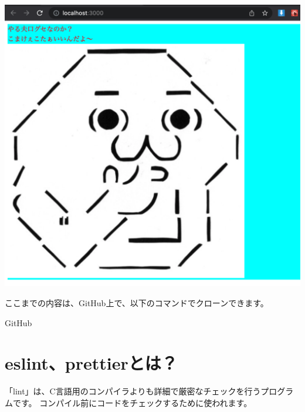 \begin{reviewimage}[H]%
\includegraphics[width=0.6\maxwidth]{./images/02-create-react-app/typescript03.png}%
\label{image:02-create-react-app:typescript03}
\end{reviewimage}
\begin{starternote}[]{}

ここまでの内容は、GitHub上で、以下のコマンドでクローンできます。

\def\startercodeblockfontsize{}
\begin{starterterminal}[]{GitHub}\end{starterterminal}
\end{starternote}

\section{eslint、prettierとは？}
\keeplastskip{
  \label{sec:2-3}
  \label{sec-03lint}
  \par\nobreak
}

「lint」は、C言語用のコンパイラよりも詳細で厳密なチェックを行うプログラムです。
コンパイル前にコードをチェックするために使われます。

